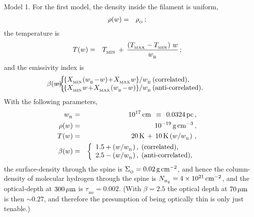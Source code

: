 \documentclass[usenatbib]{mn2e}
\newcommand{\subB}{_{_{\rm B}}}
\newcommand{\subO}{_{_{\rm O}}}
\numberwithin{equation}{section}
\begin{document}
{\sc Model 1.} For the first model, the density inside the filament is uniform, 
\begin{eqnarray}
\rho(w)&=&\rho\subO\,;
\end{eqnarray}
the temperature is
\begin{eqnarray}
T(w)&=&T_{_{\rm MIN}}\,+\,\frac{\left(T_{_{\rm MAX}}-T_{_{\rm MIN}}\right)\,w}{w\subB}\,;
\end{eqnarray}
and the emissivity index is
\begin{eqnarray}\nonumber
\beta(w)\!\!\!\!&\!\!\!=\!\!\!&\!\!\!\!\left\{\!\!\!\!\begin{array}{ll}
\left\{X_{_{\rm MIN}}(w\subB\!-\!w)\!+\!X_{_{\rm MAX}}w\right\}\!/w\subB\,\mbox{(correlated),}\\
\left\{X_{_{\rm MIN}}w\!+\!X_{_{\rm MAX}}(w\subB\!-\!w)\right\}\!/w\subB\,\mbox{(anti-correlated).}\\
\end{array}\right.\\
\end{eqnarray}
With the following parameters,
\begin{eqnarray}
w\subB&=&10^{17}\,\rm{cm}\;\,\equiv\;\,0.0324\,{\rm pc}\,,\\
\rho(w)&=&10^{-19}\,\rm{g\,cm^{-3}}\,,\\
T(w)&=&20\,{\rm K}\,+\,10\,{\rm K}\left(w/w\subB\right)\,,\\
\beta(w)&=&\left\{\begin{array}{l}
1.5+(w/w\subB)\,,\;\mbox{(correlated),}\\
2.5-(w/w\subB)\,,\;\mbox{(anti-correlated)},\\
\end{array}\right.
\end{eqnarray}
the surface-density through the spine is $\Sigma\subO=0.02\,\rm{g\,cm^{-2}}$, and hence the column-density of molecular hydrogen through the spine is $N_{_{\rm H_2}}=4\times 10^{21}\,\rm{cm}^{-2}$, and the optical-depth at $300\,\mu\rm{m}$ is $\tau_{_{300}}=0.002$. (With $\beta=2.5$ the optical depth at $70\,\mu\rm{m}$ is then $\sim 0.27$, and therefore the presumption of being optically thin is only just tenable.)
\end{document}
